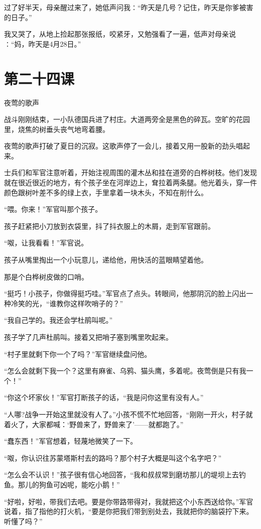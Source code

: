 \documentclass[12pt,UTF8]{ctexbook}
\begin{document}
过了好半天，母亲醒过来了，她低声问我∶“昨天是几号？记住，昨天是你爹被害的日子。”

我又哭了，从地上捡起那张报纸，咬紧牙，又勉强看了一遍，低声对母亲说∶“妈，昨天是4月28日。”

\section{第二十四课}

夜莺的歌声

战斗刚刚结束，一小队德国兵进了村庄。大道两旁全是黑色的碎瓦。空旷的花园里，烧焦的树垂头丧气地弯着腰。

夜莺的歌声打破了夏日的沉寂。这歌声停了一会儿，接着又用一股新的劲头唱起来。

士兵们和军官注意听着，开始注视周围的灌木丛和挂在道旁的白桦树枝。他们发现就在很近很近的地方，有个孩子坐在河岸边上，耷拉着两条腿。他光着头，穿一件颜色跟树叶差不多的绿上衣，手里拿着一块木头，不知在削什么。

“喂。你来！”军官叫那个孩子。

孩子赶紧把小刀放到衣袋里，抖了抖衣服上的木屑，走到军官跟前。

“呶，让我看看！”军官说。

孩子从嘴里掏出一个小玩意儿，递给他，用快活的蓝眼睛望着他。

那是个白桦树皮做的口哨。

“挺巧！小孩子，你做得挺巧哇。”军官点了点头。转眼间，他那阴沉的脸上闪出一种冷笑的光，“谁教你这样吹哨子的？”

“我自己学的。我还会学杜鹃叫呢。”

孩子学了几声杜鹃叫。接着又把哨子塞到嘴里吹起来。

“村子里就剩下你一个了吗？”军官继续盘问他。

“怎么会就剩下我一个？这里有麻雀、乌鸦、猫头鹰，多着呢。夜莺倒是只有我一个！”

“你这个坏家伙！”军官打断孩子的话，“我是问你这里有没有人。”

“人哪?战争一开始这里就没有人了。”小孩不慌不忙地回答，“刚刚一开火，村子就着火了，大家都喊：‘野兽来了，野兽来了’——就都跑了。”

“蠢东西！”军官想着，轻蔑地微笑了一下。

“呶，你认识往苏蒙塔斯村去的路吗？那个村子大概是叫这个名字吧？”

“怎么会不认识！”孩子很有信心地回答，“我和叔叔常到磨坊那儿的堤坝上去钓鱼。那儿的狗鱼可凶呢，能吃小鹅！”

“好啦，好啦，带我们去吧。要是你带路带得对，我就把这个小东西送给你。”军官说着，指了指他的打火机，“要是你把我们带到别处去，我就把你的脑袋拧下来。听懂了吗？”
\end{document}
